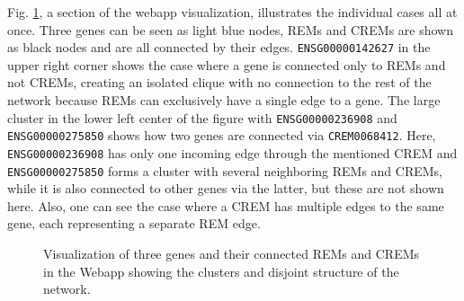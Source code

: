 \documentclass[pdftex,12pt,a4paper]{report}
\begin{document}
Fig. \ref{network_webapp}, a section of the webapp visualization, illustrates the individual cases all at once. Three genes can be seen as light blue nodes, REMs and CREMs are shown as black nodes and are all connected by their edges. \texttt{ENSG00000142627} in the upper right corner shows the case where a gene is connected only to REMs and not CREMs, creating an isolated clique with no connection to the rest of the network because REMs can exclusively have a single edge to a gene. The large cluster in the lower left center of the figure with \texttt{ENSG00000236908} and \texttt{ENSG00000275850} shows how two genes are connected via \texttt{CREM0068412}. Here, \texttt{ENSG00000236908} has only one incoming edge through the mentioned CREM and \texttt{ENSG00000275850} forms a cluster with several neighboring REMs and CREMs, while it is also connected to other genes via the latter, but these are not shown here. Also, one can see the case where a CREM has multiple edges to the same gene, each representing a separate REM edge.
\begin{figure}[!ht]
\begin{center}
	\caption{Visualization of three genes and their connected REMs and CREMs in the Webapp showing the clusters and disjoint structure of the network.}
	\label{network_webapp}
\end{center}
\end{figure}
\end{document}
